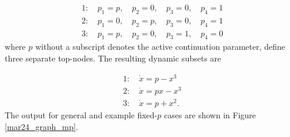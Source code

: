 \documentclass[12pt]{article}
\begin{document}
\begin{equation}
\label{mar24_eq2}
\begin{split}
1: \quad p_1=p, \quad p_2=0, \quad p_3=0, \quad p_4=1 \\ 2: \quad p_1=0, \quad p_2=p, \quad p_3=0, \quad p_4=1 \\ 3: \quad p_1=p, \quad p_2=0, \quad p_3=1, \quad p_4=0
\end{split}
\end{equation}
where $p$ without a subscript denotes the active continuation parameter, define three separate top-nodes. The resulting dynamic subsets are

\begin{equation}
\begin{split}
1: \quad \dot{x}=p-x^3 \\ 2: \quad \dot{x}=px-x^3 \\ 3: \quad \dot{x}=p+x^2.
\end{split}
\end{equation}
The output for general and example fixed-$p$ cases are shown in Figure \ref{mar24_graph_mp}. 
\end{document}
